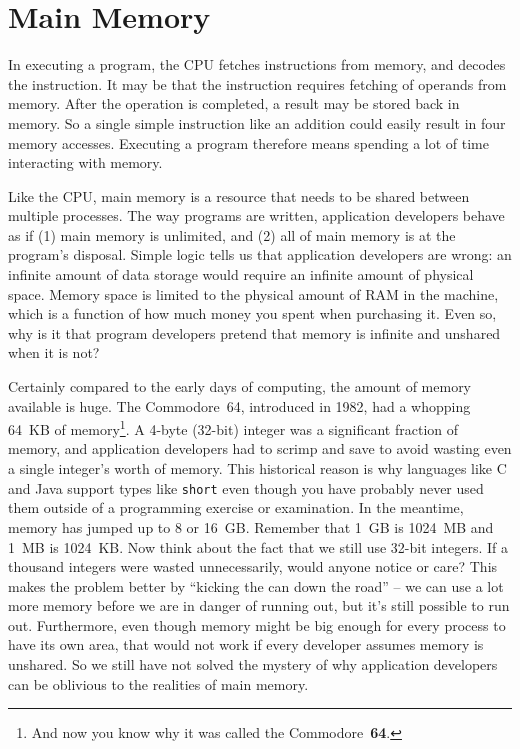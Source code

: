 




\section*{Main Memory}

In executing a program, the CPU fetches instructions from memory, and decodes the instruction. It may be that the instruction requires fetching of operands from memory. After the operation is completed, a result may be stored back in memory. So a single simple instruction like an addition could easily result in four memory accesses. Executing a program therefore means spending a lot of time interacting with memory.

Like the CPU, main memory is a resource that needs to be shared between multiple processes. The way programs are written, application developers behave as if (1) main memory is unlimited, and (2) all of main memory is at the program's disposal. Simple logic tells us that application developers are wrong: an infinite amount of data storage would require an infinite amount of physical space. Memory space is limited to the physical amount of RAM in the machine, which is a function of how much money you spent when purchasing it. Even so, why is it that program developers pretend that memory is infinite and unshared when it is not? 

Certainly compared to the early days of computing, the amount of memory available is huge. The Commodore~64, introduced in 1982, had a whopping 64~KB of memory\footnote{ And now you know why it was called the Commodore~\textbf{64}.}. A 4-byte (32-bit) integer was a significant fraction of memory, and application developers had to scrimp and save to avoid wasting even a single integer's worth of memory. This historical reason is why languages like C and Java support types like \texttt{short} even though you have probably never used them outside of a programming exercise or examination.  In the meantime, memory has jumped up to 8 or 16~GB. Remember that 1~GB is 1024~MB and 1~MB is 1024~KB. Now think about the fact that we still use 32-bit integers. If a thousand integers were wasted unnecessarily, would anyone notice or care? This makes the problem better by ``kicking the can down the road'' -- we can use a lot more memory before we are in danger of running out, but it's still possible to run out. Furthermore, even though memory might be big enough for every process to have its own area, that would not work if every developer assumes memory is unshared. So we still have not solved the mystery of why application developers can be oblivious to the realities of main memory.

